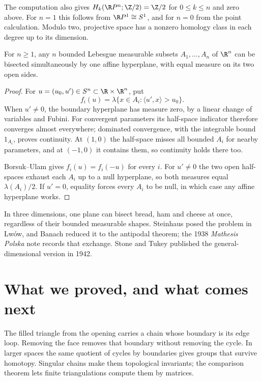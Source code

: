 The computation also gives $H_k(\R P^n;\Z/2)=\Z/2$ for $0\le k\le n$ and zero above. For $n=1$ this follows from $\R P^1\cong S^1$, and for $n=0$ from the point calculation. Modulo two, projective space has a nonzero homology class in each degree up to its dimension.

\begin{corollary}\label{cor:hamsandwich}
For $n\ge1$, any $n$ bounded Lebesgue measurable subsets $A_1,\ldots,A_n$ of $\R^n$ can be bisected simultaneously by one affine hyperplane, with equal measure on its two open sides.
\end{corollary}

\begin{proof}
For $u=(u_0,u')\in S^n\subset\R\times\R^n$, put
\[
f_i(u)=\lambda\{x\in A_i:\langle u',x\rangle>u_0\}.
\]
When $u'\ne0$, the boundary hyperplane has measure zero, by a linear change of variables and Fubini. For convergent parameters its half-space indicator therefore converges almost everywhere; dominated convergence, with the integrable bound $1_{A_i}$, proves continuity. At $(1,0)$ the half-space misses all bounded $A_i$ for nearby parameters, and at $(-1,0)$ it contains them, so continuity holds there too.

Borsuk--Ulam gives $f_i(u)=f_i(-u)$ for every $i$. For $u'\ne0$ the two open half-spaces exhaust each $A_i$ up to a null hyperplane, so both measures equal $\lambda(A_i)/2$. If $u'=0$, equality forces every $A_i$ to be null, in which case any affine hyperplane works.
\end{proof}

In three dimensions, one plane can bisect bread, ham and cheese at once, regardless of their bounded measurable shapes. Steinhaus posed the problem in Lw\'ow, and Banach reduced it to the antipodal theorem; the 1938 \emph{Mathesis Polska} note records that exchange. Stone and Tukey published the general-dimensional version in 1942.

\section{What we proved, and what comes next}

The filled triangle from the opening carries a chain whose boundary is its edge loop. Removing the face removes that boundary without removing the cycle. In larger spaces the same quotient of cycles by boundaries gives groups that survive homotopy. Singular chains make them topological invariants; the comparison theorem lets finite triangulations compute them by matrices.

